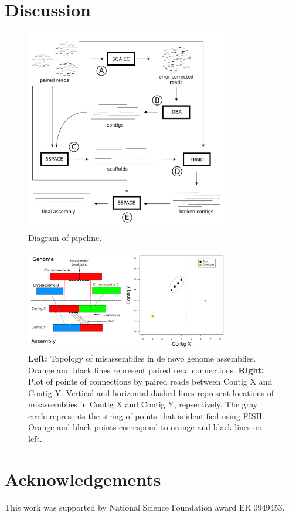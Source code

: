 \documentclass{bioinfo}
\begin{document}
\section{Discussion}


\begin{figure}[t]
\includegraphics[width=3.5in]{a5pipeline-diagram.pdf}
\vspace{-1cm}
\caption{Diagram of pipeline. }\label{fig:01}
\end{figure}

\begin{figure}[t]
\includegraphics[width=3.5in]{fish-qc.pdf}
\vspace{-1cm}
\caption{\textbf{Left:} Topology of misassemblies in de novo genome assemblies. Orange and black lines represent paired read 
connections. \textbf{Right:} Plot of points of connections by paired reads between Contig X and Contig Y. Vertical and horizontal 
dashed lines represent locations of misassemblies in Contig X and Contig Y, repsectively. The gray circle represents the string of points
that is identified using FISH. Orange and black points correspond to orange and black lines on left.}\label{fig:02}
\end{figure}




\section*{Acknowledgements}
This work was supported by National Science Foundation award ER 0949453.



\end{document}
